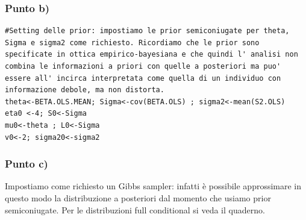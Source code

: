 \subsubsection*{Punto b)}
\begin{lstlisting}[style=R]
#Setting delle prior: impostiamo le prior semiconiugate per theta, Sigma e sigma2 come richiesto. Ricordiamo che le prior sono specificate in ottica empirico-bayesiana e che quindi l' analisi non combina le informazioni a priori con quelle a posteriori ma puo' essere all' incirca interpretata come quella di un individuo con informazione debole, ma non distorta.
theta<-BETA.OLS.MEAN; Sigma<-cov(BETA.OLS) ; sigma2<-mean(S2.OLS)
eta0 <-4; S0<-Sigma
mu0<-theta ; L0<-Sigma
v0<-2; sigma20<-sigma2
\end{lstlisting}

\subsubsection*{Punto c)}
Impostiamo come richiesto un Gibbs sampler: infatti è possibile approssimare in questo modo la distribuzione a posteriori dal momento che usiamo prior semiconiugate. 
Per le distribuzioni full conditional si veda il quaderno.

